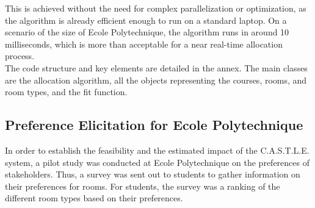 \documentclass[a4paper, oneside]{article}
\theoremstyle{plain}
\newcommand{\castle}{C{\small.}A{\small.}S{\small.}T{\small.}L{\small.}E{\small.}}
\begin{document}
This is achieved without the need for complex parallelization or optimization, as the algorithm is already efficient enough to run on a standard laptop.
On a scenario of the size of Ecole Polytechnique, the algorithm runs in around 10 milliseconds, which is more than acceptable for a near real-time allocation process.\\

The code structure and key elements are detailed in the annex. The main classes are the allocation algorithm, all the objects representing the courses, rooms,
and room types, and the fit function.

\subsection{Preference Elicitation for Ecole Polytechnique}

In order to establish the feasibility and the estimated impact of the \castle{} system, a pilot study was conducted at Ecole Polytechnique on the preferences of stakeholders.
Thus, a survey was sent out to students to gather information on their preferences for rooms. For students, the survey was a ranking of the different room types based on their preferences.\\
\end{document}
